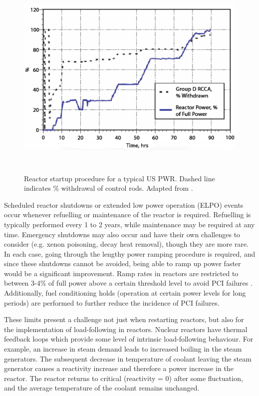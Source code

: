 \begin{figure}[htp]
\centering
\includegraphics[height=10cm]{images/reactor_startup.png}
\caption[Reactor startup procedure for a typical US PWR. Dashed line indicates \% withdrawal of control rods.]{Reactor startup procedure for a typical US PWR. Dashed line indicates \% withdrawal of control rods. Adapted from \cite{ramping}.}
\label{figure:reactor_startup}
\end{figure}

Scheduled reactor shutdowns or extended low power operation (ELPO) events occur whenever refuelling or maintenance of the reactor is required. Refuelling is typically performed every 1 to 2 years, while maintenance may be required at any time. Emergency shutdowns may also occur and have their own challenges to consider (e.g. xenon poisoning, decay heat removal), though they are more rare. In each case, going through the lengthy power ramping procedure is required, and since these shutdowns cannot be avoided, being able to ramp up power faster would be a significant improvement. Ramp rates in reactors are restricted to between 3-4\% of full power above a certain threshold level to avoid PCI failures \cite{ramping}. Additionally, fuel conditioning holds (operation at certain power levels for long periods) are performed to further reduce the incidence of PCI failures. 

These limits present a challenge not just when restarting reactors, but also for the implementation of load-following in reactors. Nuclear reactors have thermal feedback loops which provide some level of intrinsic load-following behaviour. For example, an increase in steam demand leads to increased boiling in the steam generators. The subsequent decrease in temperature of coolant leaving the steam generator causes a reactivity increase and therefore a power increase in the reactor. The reactor returns to critical (reactivity = 0) after some fluctuation, and the average temperature of the coolant remains unchanged.






